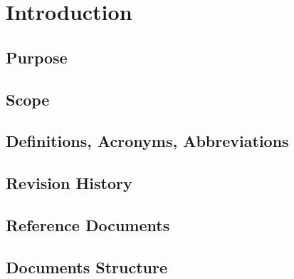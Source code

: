 \chapter{Introduction}

\section{Purpose}

\section{Scope}

\section{Definitions, Acronyms, Abbreviations}

\section{Revision History}

\section{Reference Documents}

\section{Documents Structure}